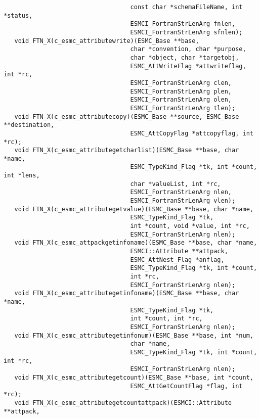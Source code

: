 \begin{verbatim}
                                   const char *schemaFileName, int *status,
                                   ESMCI_FortranStrLenArg fnlen,
                                   ESMCI_FortranStrLenArg sfnlen);
   void FTN_X(c_esmc_attributewrite)(ESMC_Base **base,
                                   char *convention, char *purpose,
                                   char *object, char *targetobj,
                                   ESMC_AttWriteFlag *attwriteflag, int *rc,
                                   ESMCI_FortranStrLenArg clen,
                                   ESMCI_FortranStrLenArg plen,
                                   ESMCI_FortranStrLenArg olen,
                                   ESMCI_FortranStrLenArg tlen);
   void FTN_X(c_esmc_attributecopy)(ESMC_Base **source, ESMC_Base **destination,
                                   ESMC_AttCopyFlag *attcopyflag, int *rc);
   void FTN_X(c_esmc_attributegetcharlist)(ESMC_Base **base, char *name,
                                   ESMC_TypeKind_Flag *tk, int *count, int *lens,
                                   char *valueList, int *rc,
                                   ESMCI_FortranStrLenArg nlen,
                                   ESMCI_FortranStrLenArg vlen);
   void FTN_X(c_esmc_attributegetvalue)(ESMC_Base **base, char *name,
                                   ESMC_TypeKind_Flag *tk,
                                   int *count, void *value, int *rc,
                                   ESMCI_FortranStrLenArg nlen);
   void FTN_X(c_esmc_attpackgetinfoname)(ESMC_Base **base, char *name,
                                   ESMCI::Attribute **attpack,
                                   ESMC_AttNest_Flag *anflag,
                                   ESMC_TypeKind_Flag *tk, int *count,
                                   int *rc,
                                   ESMCI_FortranStrLenArg nlen);
   void FTN_X(c_esmc_attributegetinfoname)(ESMC_Base **base, char *name,
                                   ESMC_TypeKind_Flag *tk,
                                   int *count, int *rc,
                                   ESMCI_FortranStrLenArg nlen);
   void FTN_X(c_esmc_attributegetinfonum)(ESMC_Base **base, int *num,
                                   char *name,
                                   ESMC_TypeKind_Flag *tk, int *count, int *rc,
                                   ESMCI_FortranStrLenArg nlen);
   void FTN_X(c_esmc_attributegetcount)(ESMC_Base **base, int *count,
                                   ESMC_AttGetCountFlag *flag, int *rc);
   void FTN_X(c_esmc_attributegetcountattpack)(ESMCI::Attribute **attpack,

\end{verbatim}
